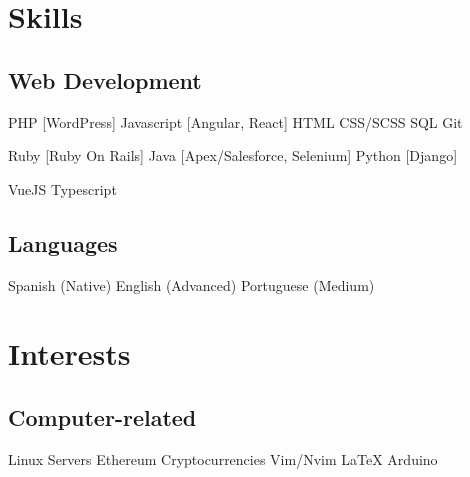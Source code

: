 \documentclass[]{deedy-resume-openfont}
\begin{document}




\begin{minipage}[t]{0.33\textwidth} 


\section{Skills}
\subsection{Web Development}
PHP [WordPress]\textbullet{} Javascript [Angular, React] \textbullet{} HTML \textbullet{} CSS/SCSS \textbullet{} SQL \textbullet{} Git
\sectionsep

Ruby [Ruby On Rails] \textbullet{} Java [Apex/Salesforce, Selenium] \textbullet{} Python [Django]
\sectionsep

VueJS \textbullet{} Typescript
\sectionsep

\subsection{Languages}
Spanish (Native) \textbullet{} English (Advanced) \textbullet{} Portuguese (Medium)
\sectionsep


\section{Interests}

\subsection{Computer-related}

Linux Servers \textbullet{} Ethereum \textbullet{} Cryptocurrencies \textbullet{} Vim/Nvim \textbullet{} \LaTeX \textbullet{} Arduino


\end{minipage}
\end{document}
